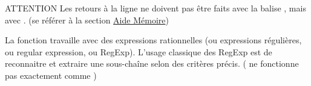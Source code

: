 \bigskip

\begin{RedBoxTitle}{ATTENTION}
    Les retours à la ligne ne doivent pas être faits avec la balise , mais avec .
    (se référer à la section \hyperref[sec:AideMemoire]{Aide Mémoire})
\end{RedBoxTitle}

\bigskip

\begin{YellowBox}
La fonction  travaille avec des expressions rationnelles (ou expressions régulières, ou regular expression, ou RegExp).
L'usage classique des RegExp est de reconnaitre et extraire une sous-chaîne selon des critères précis.
( ne fonctionne pas exactement comme )
\end{YellowBox}
